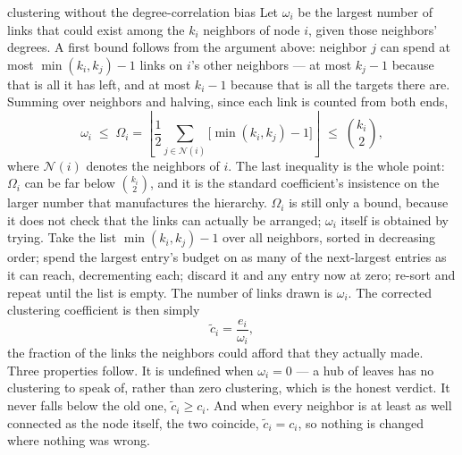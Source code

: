 \begin{calculation}{clustering without the degree-correlation bias}
Let $\omega_i$ be the largest number of links that could exist among the $k_i$
neighbors of node $i$, given those neighbors' degrees. A first bound follows from
the argument above: neighbor $j$ can spend at most $\min(k_i,k_j)-1$ links on
$i$'s other neighbors --- at most $k_j-1$ because that is all it has left, and at
most $k_i-1$ because that is all the targets there are. Summing over neighbors and
halving, since each link is counted from both ends,
\begin{equation}
  \omega_i \;\le\; \Omega_i = \left\lfloor \frac{1}{2}
  \sum_{j \in \mathcal{N}(i)} \big[\min(k_i,k_j)-1\big] \right\rfloor
  \;\le\; \binom{k_i}{2},
  \label{eq:intro-omega}
\end{equation}
where $\mathcal{N}(i)$ denotes the neighbors of $i$. The last inequality is the
whole point: $\Omega_i$ can be far below $\binom{k_i}{2}$, and it is the standard
coefficient's insistence on the larger number that manufactures the hierarchy.
$\Omega_i$ is still only a bound, because it does not check that the links can
actually be arranged; $\omega_i$ itself is obtained by trying. Take the list
$\min(k_i,k_j)-1$ over all neighbors, sorted in decreasing order; spend the
largest entry's budget on as many of the next-largest entries as it can reach,
decrementing each; discard it and any entry now at zero; re-sort and repeat until
the list is empty. The number of links drawn is $\omega_i$. The corrected
clustering coefficient is then simply
\begin{equation}
  \tilde{c}_i = \frac{e_i}{\omega_i},
  \label{eq:intro-ctilde}
\end{equation}
the fraction of the links the neighbors could afford that they actually made.
Three properties follow. It is undefined when $\omega_i=0$ --- a hub of leaves has
no clustering to speak of, rather than zero clustering, which is the honest
verdict. It never falls below the old one, $\tilde{c}_i \ge c_i$. And when every
neighbor is at least as well connected as the node itself, the two coincide,
$\tilde{c}_i = c_i$, so nothing is changed where nothing was wrong.
\end{calculation}

